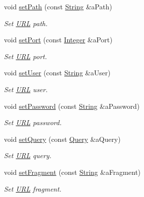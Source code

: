 \begin{DoxyCompactItemize}
void \hyperlink{classlibrary_1_1io_1_1_u_r_l_ab7f4c0962a64eb3feb5b293c57f7f142}{set\+Path} (const \hyperlink{namespacelibrary_1_1io_a7469b45835a4421045db344d6a5a1f85}{String} \&a\+Path)
\begin{DoxyCompactList}\small\item\em Set \hyperlink{classlibrary_1_1io_1_1_u_r_l}{U\+RL} path. \end{DoxyCompactList}\item 
void \hyperlink{classlibrary_1_1io_1_1_u_r_l_ae2be028e95ac8a5d50735e090619fce2}{set\+Port} (const \hyperlink{namespacelibrary_1_1io_a0a929bf9e177597c2e92073d200dda53}{Integer} \&a\+Port)
\begin{DoxyCompactList}\small\item\em Set \hyperlink{classlibrary_1_1io_1_1_u_r_l}{U\+RL} port. \end{DoxyCompactList}\item 
void \hyperlink{classlibrary_1_1io_1_1_u_r_l_a5da0891706e5d52243d28f4956a57943}{set\+User} (const \hyperlink{namespacelibrary_1_1io_a7469b45835a4421045db344d6a5a1f85}{String} \&a\+User)
\begin{DoxyCompactList}\small\item\em Set \hyperlink{classlibrary_1_1io_1_1_u_r_l}{U\+RL} user. \end{DoxyCompactList}\item 
void \hyperlink{classlibrary_1_1io_1_1_u_r_l_a43360d356d992c5357117cd93b4eab06}{set\+Password} (const \hyperlink{namespacelibrary_1_1io_a7469b45835a4421045db344d6a5a1f85}{String} \&a\+Password)
\begin{DoxyCompactList}\small\item\em Set \hyperlink{classlibrary_1_1io_1_1_u_r_l}{U\+RL} password. \end{DoxyCompactList}\item 
void \hyperlink{classlibrary_1_1io_1_1_u_r_l_aaff5008a336303ac208f97fbb33d0e94}{set\+Query} (const \hyperlink{namespacelibrary_1_1io_a39ebaf2265de78ba79eb5347f2af61b3}{Query} \&a\+Query)
\begin{DoxyCompactList}\small\item\em Set \hyperlink{classlibrary_1_1io_1_1_u_r_l}{U\+RL} query. \end{DoxyCompactList}\item 
void \hyperlink{classlibrary_1_1io_1_1_u_r_l_a0ae406ca81b40b02761918ad953a4255}{set\+Fragment} (const \hyperlink{namespacelibrary_1_1io_a7469b45835a4421045db344d6a5a1f85}{String} \&a\+Fragment)
\begin{DoxyCompactList}\small\item\em Set \hyperlink{classlibrary_1_1io_1_1_u_r_l}{U\+RL} fragment. \end{DoxyCompactList}\end{DoxyCompactItemize}
